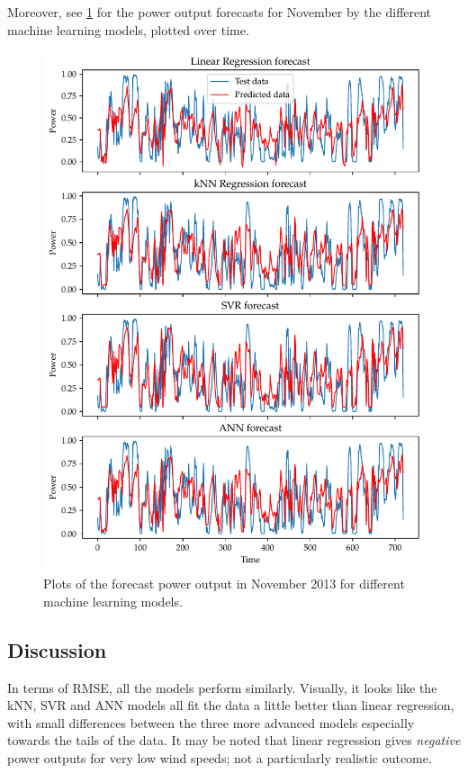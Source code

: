 \documentclass[11pt]{article}
\begin{document}
Moreover, see \cref{fig:q1-forecast-plots} for the power output forecasts for November by the different machine learning models, plotted over time.

\begin{figure}
  \centering
  \includegraphics{figures/q1_forecast_plots}
  \caption{Plots of the forecast power output in November 2013 for different machine learning models.}
  \label{fig:q1-forecast-plots}
\end{figure}


\subsection*{Discussion}

In terms of RMSE, all the models perform similarly.
Visually, it looks like the kNN, SVR and ANN models all fit the data a little better than linear regression, with small differences between the three more advanced models especially towards the tails of the data.
It may be noted that linear regression gives \emph{negative} power outputs for very low wind speeds; not a particularly realistic outcome.
\end{document}
